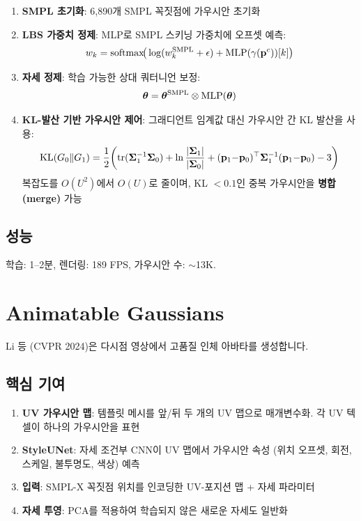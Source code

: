 \documentclass[11pt, a4paper]{report}
\begin{document}
\begin{enumerate}[leftmargin=*]
  \item \textbf{SMPL 초기화}: 6,890개 SMPL 꼭짓점에 가우시안 초기화
  \item \textbf{LBS 가중치 정제}: MLP로 SMPL 스키닝 가중치에 오프셋 예측:
  \begin{equation}
    w_k = \mathrm{softmax}\!\big( \log(w_k^{\text{SMPL}} + \epsilon) + \mathrm{MLP}(\gamma(\mathbf{p}^c))[k] \big)
  \end{equation}

  \item \textbf{자세 정제}: 학습 가능한 상대 쿼터니언 보정:
  \begin{equation}
    \bm{\theta} = \bm{\theta}^{\text{SMPL}} \otimes \mathrm{MLP}(\bm{\theta})
  \end{equation}

  \item \textbf{KL-발산 기반 가우시안 제어}: 그래디언트 임계값 대신 가우시안 간 KL 발산을 사용:
  \begin{equation}
    \text{KL}(G_0 \| G_1) = \frac{1}{2}\!\left( \mathrm{tr}(\bm{\Sigma}_1^{-1}\bm{\Sigma}_0) + \ln\frac{|\bm{\Sigma}_1|}{|\bm{\Sigma}_0|} + (\mathbf{p}_1{-}\mathbf{p}_0)^\top \bm{\Sigma}_1^{-1}(\mathbf{p}_1{-}\mathbf{p}_0) - 3 \right)
  \end{equation}
  복잡도를 $O(U^2)$에서 $O(U)$로 줄이며, KL $< 0.1$인 중복 가우시안을 \textbf{병합(merge)} 가능
\end{enumerate}

\subsection{성능}

학습: 1--2분, 렌더링: 189 FPS, 가우시안 수: $\sim$13K.


\section{Animatable Gaussians}

Li 등 (CVPR 2024)은 다시점 영상에서 고품질 인체 아바타를 생성합니다.

\subsection{핵심 기여}

\begin{enumerate}[leftmargin=*]
  \item \textbf{UV 가우시안 맵}: 템플릿 메시를 앞/뒤 두 개의 UV 맵으로 매개변수화. 각 UV 텍셀이 하나의 가우시안을 표현
  \item \textbf{StyleUNet}: 자세 조건부 CNN이 UV 맵에서 가우시안 속성 (위치 오프셋, 회전, 스케일, 불투명도, 색상) 예측
  \item \textbf{입력}: SMPL-X 꼭짓점 위치를 인코딩한 UV-포지션 맵 + 자세 파라미터
  \item \textbf{자세 투영}: PCA를 적용하여 학습되지 않은 새로운 자세도 일반화
\end{enumerate}
\end{document}
